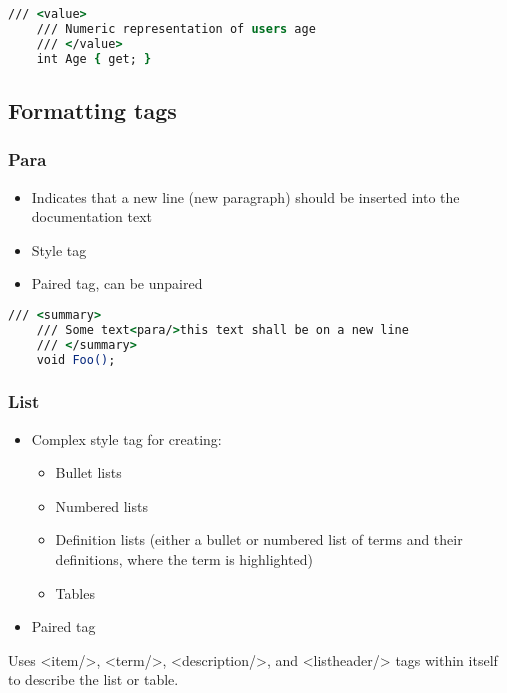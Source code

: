 \begin{lstlisting}[language=csh]
    /// <value>
    /// Numeric representation of users age
    /// </value>
    int Age { get; }
\end{lstlisting}

\subsection{Formatting tags}

\subsubsection*{Para}
\begin{itemize}
    \item Indicates that a new line (new paragraph) should be inserted into the documentation text
    \item Style tag
    \item Paired tag, can be unpaired
\end{itemize}

\begin{lstlisting}[language=csh]
    /// <summary>
    /// Some text<para/>this text shall be on a new line
    /// </summary>
    void Foo();
\end{lstlisting}

\subsubsection*{List} \label{sec:listTag}
\begin{itemize}
    \item Complex style tag for creating:
    \begin{itemize}
        \item Bullet lists
        \item Numbered lists
        \item Definition lists (either a bullet or numbered list of terms and their definitions, where the term is highlighted)
        \item Tables
    \end{itemize}
    \item Paired tag
\end{itemize}

Uses <item/>, <term/>, <description/>, and <listheader/> tags within itself to describe the list or table.

